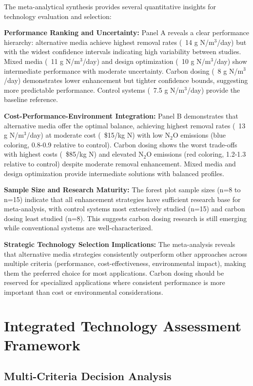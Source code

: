 \documentclass[12pt,a4paper]{article}
\begin{document}
The meta-analytical synthesis provides several quantitative insights for technology evaluation and selection:

\textbf{Performance Ranking and Uncertainty:} Panel A reveals a clear performance hierarchy: alternative media achieve highest removal rates (~14 g N/m$^3$/day) but with the widest confidence intervals indicating high variability between studies. Mixed media (~11 g N/m$^3$/day) and design optimization (~10 g N/m$^3$/day) show intermediate performance with moderate uncertainty. Carbon dosing (~8 g N/m$^3$/day) demonstrates lower enhancement but tighter confidence bounds, suggesting more predictable performance. Control systems (~7.5 g N/m$^3$/day) provide the baseline reference.

\textbf{Cost-Performance-Environment Integration:} Panel B demonstrates that alternative media offer the optimal balance, achieving highest removal rates (~13 g N/m$^3$/day) at moderate cost (~\$15/kg N) with low N$_2$O emissions (blue coloring, 0.8-0.9 relative to control). Carbon dosing shows the worst trade-offs with highest costs (~\$85/kg N) and elevated N$_2$O emissions (red coloring, 1.2-1.3 relative to control) despite moderate removal enhancement. Mixed media and design optimization provide intermediate solutions with balanced profiles.

\textbf{Sample Size and Research Maturity:} The forest plot sample sizes (n=8 to n=15) indicate that all enhancement strategies have sufficient research base for meta-analysis, with control systems most extensively studied (n=15) and carbon dosing least studied (n=8). This suggests carbon dosing research is still emerging while conventional systems are well-characterized.

\textbf{Strategic Technology Selection Implications:} The meta-analysis reveals that alternative media strategies consistently outperform other approaches across multiple criteria (performance, cost-effectiveness, environmental impact), making them the preferred choice for most applications. Carbon dosing should be reserved for specialized applications where consistent performance is more important than cost or environmental considerations.

\section{Integrated Technology Assessment Framework}

\subsection{Multi-Criteria Decision Analysis}
\end{document}
